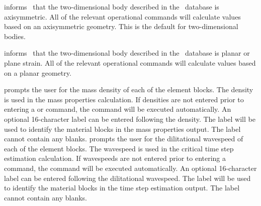 {
 informs \numbers\ that the two-dimensional body
described in the \EXO\ database is axisymmetric.  All of the relevant
operational commands will calculate values based on an axisymmetric
geometry.  This is the default for two-dimensional bodies.
}

 {
 informs \numbers\ that the two-dimensional body described
in the \EXO\ database is planar or plane strain. All of the relevant
operational commands will calculate values based on a planar geometry. 
}

 {
 prompts the user for the mass density of each of the
element blocks.  The density is used in the mass properties calculation.
If densities are not entered prior to entering a  or
 command, the  command will be executed
automatically.  An optional 16-character label can be entered following
the density.  The label will be used to identify the material blocks in
the mass properties output. The label cannot contain any blanks. 
}
\filbreak
{} { 
 prompts the user for the dilitational wavespeed of each
of the element blocks.  The wavespeed is used in the critical time step
estimation calculation.  If wavespeeds are not entered prior to entering
a  command, the  command will be executed
automatically.  An optional 16-character label can be entered following
the dilitational wavespeed. The label will be used to identify the
material blocks in the time step estimation output. The label cannot
contain any blanks. 
} 
\filbreak
